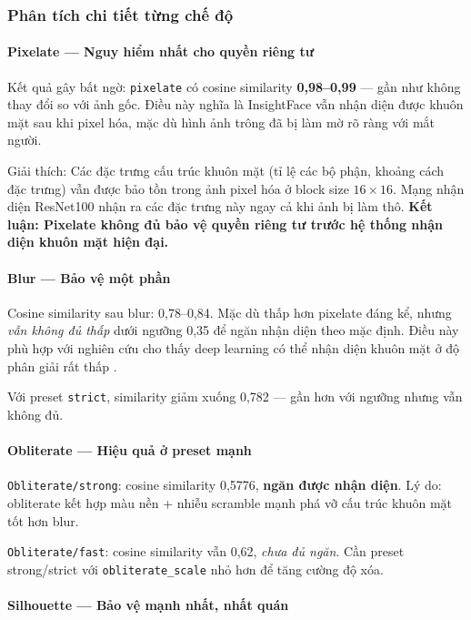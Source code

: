 \subsubsection{Phân tích chi tiết từng chế độ}

\paragraph{Pixelate --- Nguy hiểm nhất cho quyền riêng tư}

Kết quả gây bất ngờ: \texttt{pixelate} có cosine similarity \textbf{0,98--0,99} --- gần như không thay đổi so với ảnh gốc. Điều này nghĩa là InsightFace vẫn nhận diện được khuôn mặt sau khi pixel hóa, mặc dù hình ảnh trông đã bị làm mờ rõ ràng với mắt người.

Giải thích: Các đặc trưng cấu trúc khuôn mặt (tỉ lệ các bộ phận, khoảng cách đặc trưng) vẫn được bảo tồn trong ảnh pixel hóa ở block size $16 \times 16$. Mạng nhận diện ResNet100 nhận ra các đặc trưng này ngay cả khi ảnh bị làm thô. \textbf{Kết luận: Pixelate không đủ bảo vệ quyền riêng tư trước hệ thống nhận diện khuôn mặt hiện đại.}

\paragraph{Blur --- Bảo vệ một phần}

Cosine similarity sau blur: 0,78--0,84. Mặc dù thấp hơn pixelate đáng kể, nhưng \textit{vẫn không đủ thấp} dưới ngưỡng 0,35 để ngăn nhận diện theo mặc định. Điều này phù hợp với nghiên cứu cho thấy deep learning có thể nhận diện khuôn mặt ở độ phân giải rất thấp \cite{zooming2018}.

Với preset \texttt{strict}, similarity giảm xuống 0,782 --- gần hơn với ngưỡng nhưng vẫn không đủ.

\paragraph{Obliterate --- Hiệu quả ở preset mạnh}

\texttt{Obliterate/strong}: cosine similarity 0,5776, \textbf{ngăn được nhận diện}. Lý do: obliterate kết hợp màu nền + nhiễu scramble mạnh phá vỡ cấu trúc khuôn mặt tốt hơn blur.

\texttt{Obliterate/fast}: cosine similarity vẫn 0,62, \textit{chưa đủ ngăn}. Cần preset strong/strict với \texttt{obliterate\_scale} nhỏ hơn để tăng cường độ xóa.

\paragraph{Silhouette --- Bảo vệ mạnh nhất, nhất quán}

